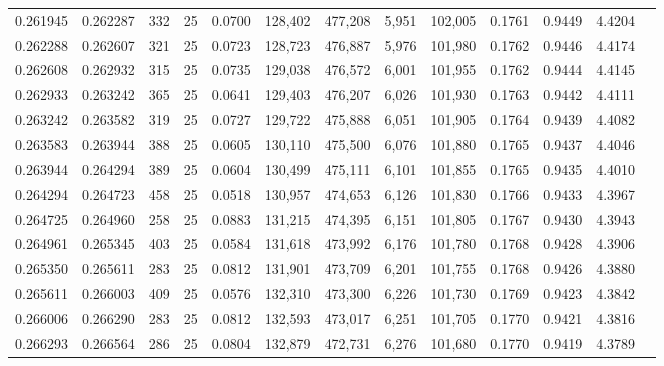 \begin{tabular}{rrrrrrrrrrrrr}
0.261945 & 0.262287 &   332 &  25 &                                     0.0700 & 128,402 & 477,208 &   5,951 & 102,005 & 0.1761 & 0.9449 & 4.4204 \\
0.262288 & 0.262607 &   321 &  25 &                                     0.0723 & 128,723 & 476,887 &   5,976 & 101,980 & 0.1762 & 0.9446 & 4.4174 \\
0.262608 & 0.262932 &   315 &  25 &                                     0.0735 & 129,038 & 476,572 &   6,001 & 101,955 & 0.1762 & 0.9444 & 4.4145 \\
0.262933 & 0.263242 &   365 &  25 &                                     0.0641 & 129,403 & 476,207 &   6,026 & 101,930 & 0.1763 & 0.9442 & 4.4111 \\
0.263242 & 0.263582 &   319 &  25 &                                     0.0727 & 129,722 & 475,888 &   6,051 & 101,905 & 0.1764 & 0.9439 & 4.4082 \\
0.263583 & 0.263944 &   388 &  25 &                                     0.0605 & 130,110 & 475,500 &   6,076 & 101,880 & 0.1765 & 0.9437 & 4.4046 \\
0.263944 & 0.264294 &   389 &  25 &                                     0.0604 & 130,499 & 475,111 &   6,101 & 101,855 & 0.1765 & 0.9435 & 4.4010 \\
0.264294 & 0.264723 &   458 &  25 &                                     0.0518 & 130,957 & 474,653 &   6,126 & 101,830 & 0.1766 & 0.9433 & 4.3967 \\
0.264725 & 0.264960 &   258 &  25 &                                     0.0883 & 131,215 & 474,395 &   6,151 & 101,805 & 0.1767 & 0.9430 & 4.3943 \\
0.264961 & 0.265345 &   403 &  25 &                                     0.0584 & 131,618 & 473,992 &   6,176 & 101,780 & 0.1768 & 0.9428 & 4.3906 \\
0.265350 & 0.265611 &   283 &  25 &                                     0.0812 & 131,901 & 473,709 &   6,201 & 101,755 & 0.1768 & 0.9426 & 4.3880 \\
0.265611 & 0.266003 &   409 &  25 &                                     0.0576 & 132,310 & 473,300 &   6,226 & 101,730 & 0.1769 & 0.9423 & 4.3842 \\
0.266006 & 0.266290 &   283 &  25 &                                     0.0812 & 132,593 & 473,017 &   6,251 & 101,705 & 0.1770 & 0.9421 & 4.3816 \\
0.266293 & 0.266564 &   286 &  25 &                                     0.0804 & 132,879 & 472,731 &   6,276 & 101,680 & 0.1770 & 0.9419 & 4.3789 \\

\end{tabular}
